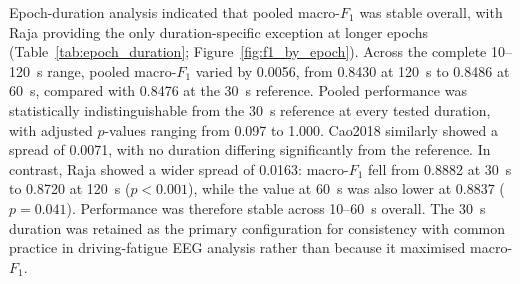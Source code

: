 Epoch-duration analysis indicated that pooled macro-$F_1$ was stable overall, with Raja providing the only duration-specific exception at longer epochs (Table~\ref{tab:epoch_duration}; Figure~\ref{fig:f1_by_epoch}). Across the complete 10--120~s range, pooled macro-$F_1$ varied by 0.0056, from 0.8430 at 120~s to 0.8486 at 60~s, compared with 0.8476 at the 30~s reference. Pooled performance was statistically indistinguishable from the 30~s reference at every tested duration, with adjusted $p$-values ranging from 0.097 to 1.000. Cao2018 similarly showed a spread of 0.0071, with no duration differing significantly from the reference. In contrast, Raja showed a wider spread of 0.0163: macro-$F_1$ fell from 0.8882 at 30~s to 0.8720 at 120~s ($p<0.001$), while the value at 60~s was also lower at 0.8837 ($p=0.041$). Performance was therefore stable across 10--60~s overall. The 30~s duration was retained as the primary configuration for consistency with common practice in driving-fatigue EEG analysis rather than because it maximised macro-$F_1$.
